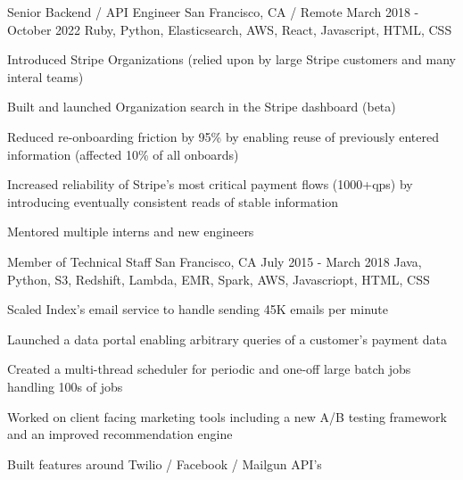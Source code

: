 \documentclass[letterpaper]{simjega-resume}
\begin{document}
{Senior Backend / API Engineer}
{San Francisco, CA / Remote}
{March 2018 - October 2022}
{Ruby, Python, Elasticsearch, AWS, React, Javascript, HTML, CSS}
{\begin{tightitemize}
\item[] Introduced Stripe Organizations (relied upon by large Stripe customers and many interal teams)
\item[] Built and launched Organization search in the Stripe dashboard (beta)
\item[] Reduced re-onboarding friction by 95\% by enabling reuse of previously entered information (affected 10\% of all onboards)
\item[] Increased reliability of Stripe's most critical payment flows (1000+qps) by introducing eventually consistent reads of stable information
\item[] Mentored multiple interns and new engineers
\end{tightitemize}}

{Member of Technical Staff}
{San Francisco, CA}
{July 2015 - March 2018}
{Java, Python, S3, Redshift, Lambda, EMR, Spark, AWS, Javascriopt, HTML, CSS}
{\begin{tightitemize}
\item[] Scaled Index's email service to handle sending 45K emails per minute
\item[] Launched a data portal enabling arbitrary queries of a customer's payment data
\item[] Created a multi-thread scheduler for periodic and one-off large batch jobs handling 100s of jobs
\item[] Worked on client facing marketing tools including a new A/B testing framework and an improved recommendation engine
\item[] Built features around Twilio / Facebook / Mailgun API's
\end{tightitemize}}
\end{document}
